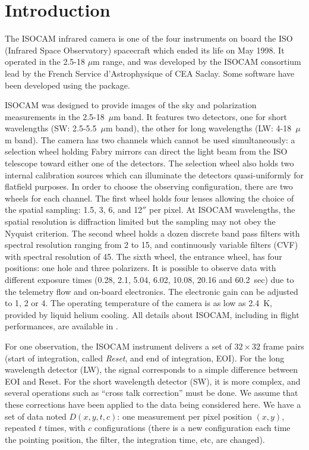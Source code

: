 \chapter{Introduction}
\label{ch_iso}
 
The ISOCAM infrared camera is one of the four instruments on board the
ISO (Infrared Space Observatory) spacecraft which 
ended its life on May 1998. It operated in the 2.5-18 $\mu$m
range, and was developed by the ISOCAM consortium lead by the French
Service d'Astrophysique of CEA Saclay.  
Some software have been developed using the \proj package.

ISOCAM was designed to provide images of the sky and polarization
measurements in the 2.5-18~$\mu$m band. It features two 
detectors, one for short wavelengths (SW: 2.5-5.5~$\mu$m band), the
other for long wavelengths (LW: 4-18~$\mu$m band). The camera has  
two channels which cannot be used simultaneously: a selection wheel
holding Fabry mirrors can direct the light beam from the ISO
telescope toward either one of the detectors. The selection
wheel also holds two internal calibration sources which can illuminate
 the detectors quasi-uniformly for flatfield purposes. In order to choose the
observing configuration, there are two wheels for each channel. The
first wheel holds four lenses allowing the choice of the spatial sampling:
1.5, 3, 6, and 12$''$ per
pixel. At ISOCAM wavelengths, the spatial resolution is diffraction
limited but the sampling may not obey the Nyquist criterion.  
The second wheel holds a dozen  discrete band pass
filters with spectral resolution ranging from 2 to 15, 
and continuously variable filters (CVF) with spectral resolution of 45.
The sixth wheel, the entrance wheel, has four positions: one
hole and three polarizers.  It is possible to observe data with different
exposure times (0.28, 2.1, 5.04, 6.02, 10.08, 20.16 and 60.2~sec) due to
the telemetry flow and on-board electronics. The electronic gain
can be adjusted to 1, 2 or 4.  The operating temperature of the camera
is as low as 2.4~K, provided by liquid helium
cooling. All details about ISOCAM, including in flight performances, are
available in \cite{starck:ces96}.  

For one observation, the ISOCAM instrument delivers a set of $32\times32$
frame pairs (start of integration, called {\em Reset}, and end of integration,
EOI). For the long wavelength detector (LW), the signal corresponds
to a simple difference between EOI and Reset. For the short wavelength
detector (SW), it is more complex, and several operations such as
``cross talk correction'' must be done. We assume that these
corrections have been applied to the data being considered
here. We have a set of data noted $D(x,y,t,c)$: one
measurement per pixel position $(x,y)$,  
repeated $t$ times, with $c$ configurations (there is a new
configuration each time the pointing position, the filter, the
integration time, etc, are changed).

